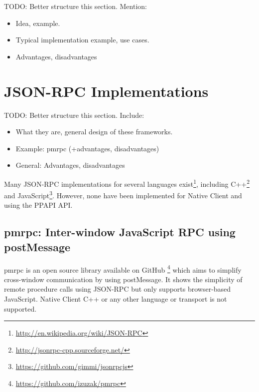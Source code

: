 TODO: Better structure this section. Mention:
\begin{itemize}
	\item Idea, example.
	\item Typical implementation example, use cases.
	\item Advantages, disadvantages
\end{itemize}



\section{JSON-RPC Implementations} %

TODO: Better structure this section. Include:
\begin{itemize}
	\item What they are, general design of these frameworks.
	\item Example: pmrpc (+advantages, disadvantages)
	\item General: Advantages, disadvantages
\end{itemize}

\label{sec:json_rpc_implementations}
Many JSON-RPC implementations for several languages exist\footnote{\url{http://en.wikipedia.org/wiki/JSON-RPC}}, including C++\footnote{\url{http://jsonrpc-cpp.sourceforge.net/}} and JavaScript\footnote{\url{https://github.com/gimmi/jsonrpcjs}}. However, none have been implemented for Native Client and using the PPAPI API.

\subsection{pmrpc: Inter-window JavaScript RPC using postMessage} %
\label{sub:pmrpc_json_rpc_using_postmessage}
pmrpc is an open source library available on GitHub \footnote{\url{https://github.com/izuzak/pmrpc}} which aims to simplify cross-window communication by using postMessage. It shows the simplicity of remote procedure calls using JSON-RPC but only supports browser-based JavaScript. Native Client C++ or any other language or transport is not supported.

